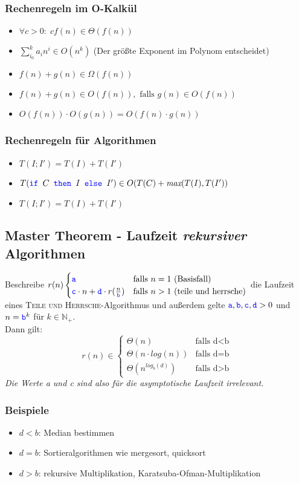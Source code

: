 \documentclass{article}
\newcommand{\N}{\mathbb{N_+}} %
\newcommand{\blue}[1]{\textcolor{blue}{#1}}
\newcommand{\word}[1]{\blue{\texttt{#1}}}
\begin{document}
\subsubsection{Rechenregeln im O-Kalkül}
\begin{itemize}
    \item $\forall c > 0:\;cf(n)\in\Theta(f(n))$
    \item $\displaystyle{\sum^k_{i_0}}a_in^i\in O(n^k)$ \qquad (Der größte Exponent im Polynom entscheidet)
    \item $f(n)+g(n)\in\Omega(f(n))$
    \item $f(n)+g(n)\in O(f(n)), \text{ falls }g(n)\in O(f(n))$
    \item $O(f(n)) \cdot O(g(n)) = O(f(n)\cdot g(n))$
\end{itemize}

\subsubsection{Rechenregeln für Algorithmen}
\begin{itemize}
    \item $T(I;I') = T(I) + T(I')$
    \item $T(\word{if }C\word{ then } I \word{ else } I') \in O(T(C)+\textit{max}(T(I), T(I'))$
    \item $T(I;I') = T(I) + T(I')$
\end{itemize}

\subsection{Master Theorem - Laufzeit \textit{rekursiver} Algorithmen}
Beschreibe $r(n)\begin{cases}
\word{a} & \text{falls }n=1\text{ (Basisfall)}\\
\word{c}\cdot n+\word{d}\cdot r(\frac{n}{\word{b}}) & \text{falls }n>1\text{ (teile und herrsche)}
\end{cases}$ die Laufzeit eines \textsc{Teile und Herrsche}-Algorithmus und außerdem gelte $\word{a}, \word{b}, \word{c}, \word{d}>0$ und $n=\word{b}^k$ für $k\in\N$.\\
Dann gilt:
\[
    r(n)\in\begin{cases}
        \Theta(n)&\text{falls d<b}\\
        \Theta(n\cdot log(n))&\text{falls d=b}\\
        \Theta(n^{log_b(d)})&\text{falls d>b}
    \end{cases}
\]
\textit{Die Werte a und c sind also für die asymptotische Laufzeit irrelevant.}
\subsubsection{Beispiele}
\begin{itemize}
    \item $d<b$: Median bestimmen\\
    \item $d=b$: Sortieralgorithmen wie mergesort, quicksort\\
    \item $d>b$: rekursive Multiplikation, Karatsuba-Ofman-Multiplikation
\end{itemize}
\end{document}
